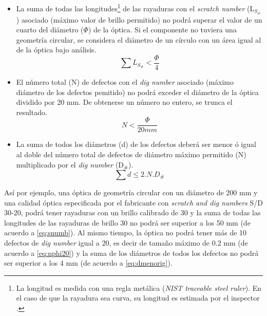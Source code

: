 \begin{itemize}
\item La suma de todas las longitudes\footnote{La longitud es medida con una regla metálica (\textit{NIST traceable steel ruler}). En el caso de que la rayadura sea curva, su longitud es estimada por el inspector \cite{Aikens}.} de las rayaduras con el \textit{scratch number} (L$_{S_{\#}}$) asociado (máximo valor de brillo permitido) no podrá superar el valor de un cuarto del diámetro ($\Phi$) de la óptica. Si el componente no tuviera una geometría circular, se considera el diámetro de un círculo con un área igual al de la óptica bajo análisis.
\begin{equation}
\sum L_{S_{\#}} < \frac{\Phi}{4}
\label{eq:snumb}
\end{equation}
\item El número total (N) de defectos con el \textit{dig number} asociado (máximo diámetro de los defectos pemitido) no podrá exceder el diámetro de la óptica dividido por 20 mm. De obtenerse un número no entero, se trunca el resultado.
\begin{equation}
N  <  \frac{\Phi}{20 mm}
\label{eq:nphi20}
\end{equation}
\item La suma de todos los diámetros (d) de los defectos deberá ser menor ó igual al doble del número total de defectos de diámetro máximo permitido (N) multiplicado por el \textit{dig number} (D$_{\#}$).
\begin{equation}
\sum d 	\leq 2 . N . D_{\#}
\label{eq:dmenorig}
\end{equation}
\end{itemize}
\hspace{0.5cm}Así por ejemplo, una óptica de geometría circular con un diámetro de 200 mm y una calidad óptica especificada por el fabricante con \textit{scratch and dig numbers} S/D 30-20, podrá tener rayaduras con un brillo calibrado de 30 y la suma de todas las longitudes de las rayaduras de brillo 30 no podrá ser superior a los 50 mm (de acuerdo a \eqref{eq:snumb}). Al mismo tiempo, la óptica no podrá tener más de 10 defectos de \textit{dig number} igual a 20, es decir de tamaño máximo de 0.2 mm (de acuerdo a  \eqref{eq:nphi20}) y la suma de los diámetros de todos los defectos no podrá ser superior a los 4 mm (de acuerdo a \eqref{eq:dmenorig}).

